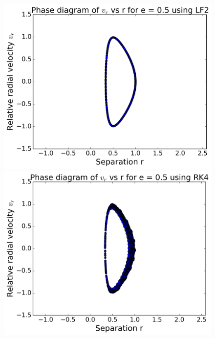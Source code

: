 \begin{figure}[H]
	\centering
	\begin{minipage}[b]{0.48\linewidth}
		\includegraphics[width=\linewidth]{plots_p1/LF2_e05_rv.png}
	\end{minipage}
	\begin{minipage}[b]{0.48\linewidth}
		\includegraphics[width=\linewidth]{plots_p1/RK4_e05_rv.png}
	\end{minipage}
\end{figure}

